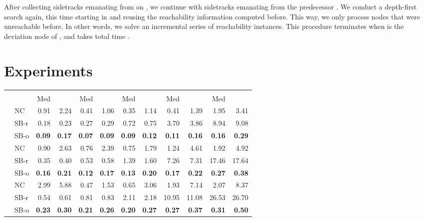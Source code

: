 \documentclass[runningheads,a4paper]{llncs}
\begin{document}
After collecting sidetracks emanating from  on , we continue with sidetracks emanating from the predecessor .
We conduct a depth-first search again, this time starting in  and reusing the reachability information computed before.
This way, we only process nodes that were unreachable before.
In other words, we solve an incremental series of reachability instances.
This procedure terminates when  is the deviation node of , and takes total time .


\section{Experiments}
\label{sec:experiments}

\begin{table}[tb]
\scriptsize
\centering
\begin{tabularx}{1\textwidth}{p{0.8cm}p{0.8cm}|RR|RR|RR|RR|RR}
& &  &  &  &  &  \\
 \centering  & & Med &  & Med &  & Med &  & Med &  & Med &  \\
\hline
\centering{} & \centering NC & 0.91 & 2.24 & 0.41 & 1.06 & 0.35 & 1.14 & 0.41 & 1.39 & 1.95 & 3.41 \\
& \centering SB-r  & 0.18 & 0.23 & 0.27 & 0.29 & 0.72 & 0.75 & 3.70 & 3.86 & 8.94 & 9.08 \\
& \centering SB-o  & \textbf{0.09} & \textbf{0.17} & \textbf{0.07} & \textbf{0.09} & \textbf{0.09} & \textbf{0.12} & \textbf{0.11} & \textbf{0.16} & \textbf{0.16} & \textbf{0.29} \\
\hline
\centering{} & \centering NC & 0.90 & 2.63 & 0.76 & 2.39 & 0.75 & 1.79 & 1.24 & 4.61 & 1.92 & 4.92 \\
& \centering SB-r  & 0.35 & 0.40 & 0.53 & 0.58 & 1.39 & 1.60 & 7.26 & 7.31 & 17.46 & 17.64 \\
& \centering SB-o  & \textbf{0.16} & \textbf{0.21} & \textbf{0.12} & \textbf{0.17} & \textbf{0.13} & \textbf{0.20} & \textbf{0.17} & \textbf{0.22} & \textbf{0.27} & \textbf{0.38} \\
\hline
\centering{} & \centering NC & 2.99 & 5.88 & 0.47 & 1.53 & 0.65 & 3.06 & 1.93 & 7.14 & 2.07 & 8.37 \\
& \centering SB-r  & 0.54 & 0.61 & 0.81 & 0.83 & 2.11 & 2.18 & 10.95 & 11.08 & 26.53 & 26.70 \\
& \centering SB-o  & \textbf{0.23} & \textbf{0.30} & \textbf{0.21} & \textbf{0.26} & \textbf{0.20} & \textbf{0.27} & \textbf{0.27} & \textbf{0.37} & \textbf{0.31} & \textbf{0.50} \\

\end{tabularx}
\end{table}
\end{document}
